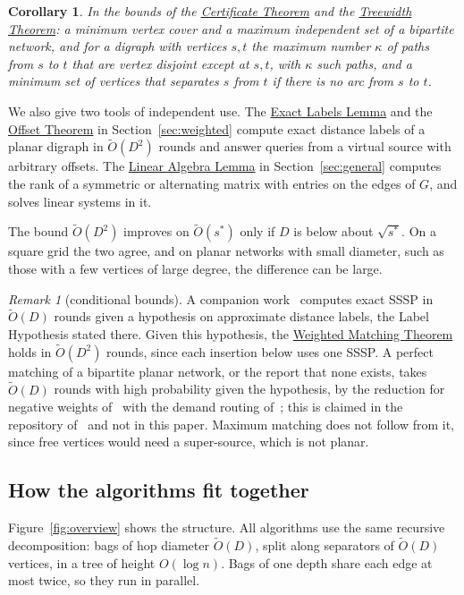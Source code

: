 \documentclass[11pt]{article}
\newtheorem{corollary}[theorem]{Corollary}
\theoremstyle{definition}
\theoremstyle{remark}
\newtheorem{remark}[theorem]{Remark}
\theoremstyle{plain}
\newcommand{\ThmWeight}{\hyperref[thm:weight]{Weighted Matching Theorem}}
\newcommand{\ThmCert}{\hyperref[thm:cert]{Certificate Theorem}}
\newcommand{\ThmTw}{\hyperref[thm:tw]{Treewidth Theorem}}
\newcommand{\LemLabels}{\hyperref[lem:labels]{Exact Labels Lemma}}
\newcommand{\ThmOff}{\hyperref[thm:off]{Offset Theorem}}
\newcommand{\LemLA}{\hyperref[lem:la]{Linear Algebra Lemma}}
\newcommand{\Ot}{\tilde O}
\begin{document}
\begin{corollary}\label{cor:paths}
In the bounds of the \ThmCert{} and the \ThmTw{}: a minimum vertex cover and a maximum independent set
of a bipartite network, and for a digraph with vertices $s,t$ the maximum number $\kappa$ of paths from
$s$ to $t$ that are vertex disjoint except at $s,t$, with $\kappa$ such paths, and a minimum set of
vertices that separates $s$ from $t$ if there is no arc from $s$ to $t$.
\end{corollary}

We also give two tools of independent use. The \LemLabels{} and the \ThmOff{} in
Section~\ref{sec:weighted} compute exact distance labels of a planar digraph in $\Ot(D^2)$ rounds and
answer queries from a virtual source with arbitrary offsets. The \LemLA{} in Section~\ref{sec:general}
computes the rank of a symmetric or alternating matrix with entries on the edges of $G$, and solves
linear systems in it.

The bound $\Ot(D^2)$ improves on $\Ot(s^*)$ only if $D$ is below about $\sqrt{s^*}$. On a square grid
the two agree, and on planar networks with small diameter, such as those with a few vertices of large degree, the
difference can be large.

\begin{remark}[conditional bounds]\label{rem:cond}
A companion work~\cite{S26} computes exact SSSP in $\Ot(D)$ rounds given a hypothesis on approximate
distance labels, the Label Hypothesis stated there. Given this hypothesis, the \ThmWeight{} holds in
$\Ot(D^2)$ rounds, since each insertion below uses one SSSP. A perfect matching of a bipartite planar
network, or the report that none exists, takes $\Ot(D)$ rounds with high probability given the hypothesis, by the
reduction for negative weights of~\cite{FHLRS25} with the demand routing of~\cite{MN95}; this is claimed in the
repository of~\cite{S26} and not in this paper. Maximum matching does not follow from it, since free vertices would need a
super-source, which is not planar.
\end{remark}

\subsection{How the algorithms fit together}

Figure~\ref{fig:overview} shows the structure. All algorithms use the same recursive decomposition:
bags of hop diameter $\Ot(D)$, split along separators of $\Ot(D)$ vertices, in a tree of height
$O(\log n)$. Bags of one depth share each edge at most twice, so they run in parallel.
\end{document}

